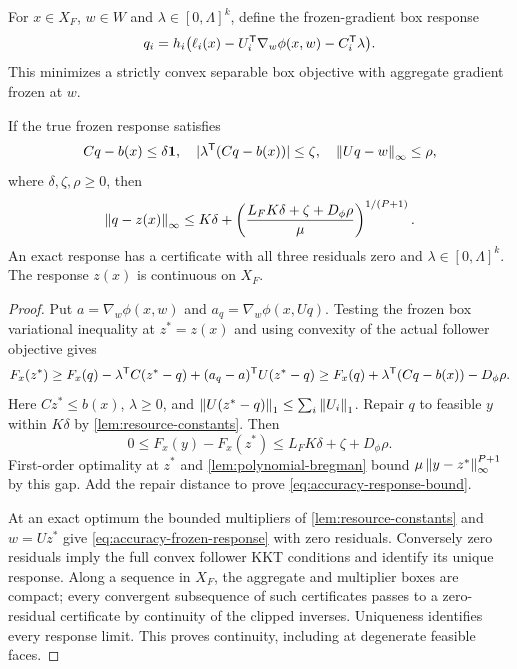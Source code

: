 For $x\in X_F$, $w\in W$ and $\lambda\in[0,\Lambda]^k$, define
the frozen-gradient box response
\begin{equation}\label{eq:accuracy-frozen-response}
 q_i=h_i\bigl(\ell_i(x)-U_i^{\mathsf T}\nabla_w\phi(x,w)
                                      -C_i^{\mathsf T}\lambda\bigr).
\end{equation}
This minimizes a strictly convex separable box objective with aggregate
gradient frozen at $w$.

\begin{lemma}\label{lem:accuracy-certificate}
If the true frozen response satisfies
\begin{equation}\label{eq:accuracy-residuals}
 Cq-b(x)\le\delta\mathbf1,\quad
 |\lambda^{\mathsf T}(Cq-b(x))|\le\zeta,\quad
                       \left\lVert Uq-w\right\rVert_\infty\le\rho,
\end{equation}
where $\delta,\zeta,\rho\ge0$, then
\begin{equation}\label{eq:accuracy-response-bound}
 \left\lVert q-z(x)\right\rVert_\infty
 \le K\delta+\left(\frac{L_FK\delta+\zeta+D_\phi\rho}{\mu}
                                                      \right)^{1/(P+1)}.
\end{equation}
An exact response has a certificate with all three residuals zero and
$\lambda\in[0,\Lambda]^k$. The response $z(x)$ is continuous on $X_F$.
\end{lemma}
\begin{proof}
Put $a=\nabla_w\phi(x,w)$ and $a_q=\nabla_w\phi(x,Uq)$.
Testing the frozen box variational inequality at $z^*=z(x)$ and
using convexity of the actual follower objective gives
\[
 F_x(z^*)\ge F_x(q)-\lambda^{\mathsf T} C(z^*-q)
                            +(a_q-a)^{\mathsf T} U(z^*-q)
 \ge F_x(q)+\lambda^{\mathsf T}(Cq-b(x))-D_\phi\rho.
\]
Here $Cz^*\le b(x)$, $\lambda\ge0$, and
$\left\lVert U(z^*-q)\right\rVert_1\le\sum_i\left\lVert U_i\right\rVert_1$. Repair $q$ to feasible
$y$ within $K\delta$ by \cref{lem:resource-constants}. Then
\[
 0\le F_x(y)-F_x(z^*)\le L_FK\delta+\zeta+D_\phi\rho.
\]
First-order optimality at $z^*$ and \cref{lem:polynomial-bregman}
bound $\mu\left\lVert y-z^*\right\rVert_\infty^{P+1}$ by this gap. Add the repair
distance to prove \eqref{eq:accuracy-response-bound}.

At an exact optimum the bounded multipliers of
\cref{lem:resource-constants} and $w=Uz^*$ give
\eqref{eq:accuracy-frozen-response} with zero residuals. Conversely
zero residuals imply the full convex follower KKT conditions and identify
its unique response. Along a sequence in $X_F$, the aggregate and
multiplier boxes are compact; every convergent subsequence of such
certificates passes to a zero-residual certificate by continuity of
the clipped inverses. Uniqueness identifies every response limit.
This proves continuity, including at degenerate feasible faces.
\end{proof}

